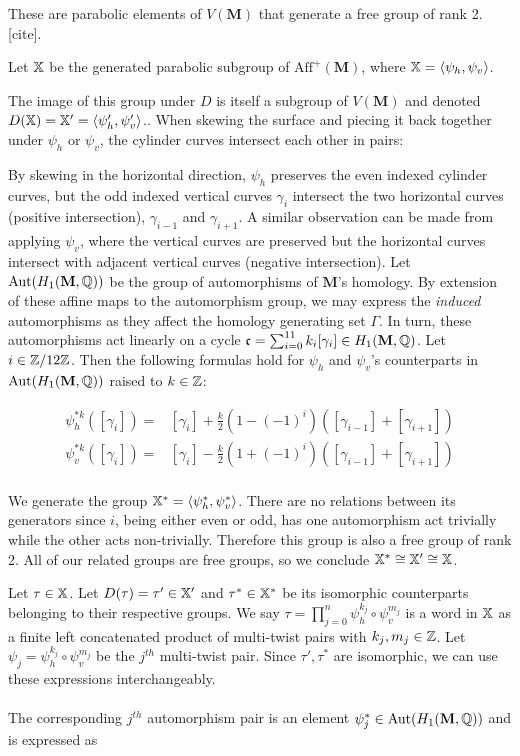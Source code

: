 \documentclass[]{article}
\def\bM{\mathbf{M}}
\def\<{\langle} \def\>{\rangle}
\def\Aut{\mathrm{Aut}}
\begin{document}
These are parabolic elements of $V(\bM)$ that generate a free group of rank 2. [cite].
\begin{Def}
Let $\mathbb{X}$ be the generated parabolic subgroup of $\text{Aff}^+(\bM)$, where $\XX=\<\psi_h,\psi_v \>$.
\end{Def}

The image of this group under $D$ is itself a subgroup of $V(\bM)$ and denoted $D(\XX)=\XX'=\<\psi_h',\psi_v' \>$.. When skewing the surface and piecing it back together under $\psi_h$ or $\psi_v$, the cylinder curves intersect each other in pairs:

\begin{figure}[H]
\centering

\end{figure}

By skewing in the horizontal direction, $\psi_h$ preserves the even indexed cylinder curves, but the odd indexed vertical curves $\gamma_i$ intersect the two horizontal curves (positive intersection), $\gamma_{i-1}$ and $\gamma_{i+1}$. A similar observation can be made from applying $\psi_v$, where the vertical curves are preserved but the horizontal curves intersect with adjacent vertical curves (negative intersection). Let $\Aut(H_1(\bM,\QQ))$ be the group of automorphisms of $\bM$'s homology. By extension of these affine maps to the automorphism group, we may express the \emph{induced} automorphisms as they affect the homology generating set $\Gamma$. In turn, these automorphisms act linearly on a cycle $\mathfrak{c}=\sum_{i=0}^{11}k_i[\gamma_i]\in H_1(\bM,\QQ)$. Let $i\in\mathbb{Z}/12\mathbb{Z}$. Then the following formulas hold for $\psi_h$ and $\psi_v$'s counterparts in $\Aut(H_1(\bM,\QQ))$ raised to $k\in\mathbb{Z}$:

\begin{align*}
\psi^{*k}_h([\gamma_i])=&[\gamma_i] + \frac{k}{2}(1-(-1)^i)([\gamma_{i-1}]+[\gamma_{i+1}])\\
\psi^{*k}_v([\gamma_i])=&[\gamma_i] - \frac{k}{2}(1+(-1)^i)([\gamma_{i-1}]+[\gamma_{i+1}])\\
\end{align*}

We generate the group $\XX^*=\<\psi^{*}_h,\psi^{*}_v \>$. There are no relations between its generators since $i$, being either even or odd, has one automorphism act trivially while the other acts non-trivially. Therefore this group is also a free group of rank 2. All of our related groups are free groups, so we conclude $\mathbb{X}^*\cong\mathbb{X}'\cong\mathbb{X}$. 


Let $\tau\in\mathbb{X}$. Let $D(\tau)=\tau'\in\mathbb{X}'$ and $\tau^*\in\mathbb{X}^*$ be its isomorphic counterparts belonging to their respective groups. We say $\tau=\prod_{j=0}^{n}\psi_h^{k_j}\circ\psi_v^{m_j}$ is a word in $\mathbb{X}$ as a finite left concatenated product of multi-twist pairs with $k_j,m_j\in\mathbb{Z}$. Let $\psi_j=\psi_h^{k_j}\circ\psi_v^{m_j}$ be the $j^{th}$ multi-twist pair. Since $\tau',\tau^*$ are isomorphic, we can use these expressions interchangeably. \\\\
The corresponding $j^{th}$ automorphism pair is an element $\psi_j^*\in\Aut(H_1(\bM,\QQ))$ and is expressed as 
\end{document}
